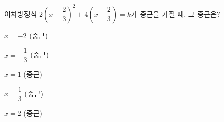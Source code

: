 이차방정식 $2\left(x-\dfrac{2}{3}\right)^2+4\left(x-\dfrac{2}{3}\right)=k$가 중근을 가질 때, 그 중근은? 
\begin{choicesii}{\rule[-3ex]{0pt}{8ex}$x=-2$ (중근)}{\rule[-3ex]{0pt}{8ex}$x=-\dfrac{1}{3}$ (중근)}{\rule[-3ex]{0pt}{8ex}$x=1$ (중근)}{\rule[-3ex]{0pt}{8ex}$x=\dfrac{1}{3}$ (중근)}{\rule[-3ex]{0pt}{8ex}$x=2$ (중근)}\end{choicesii}
